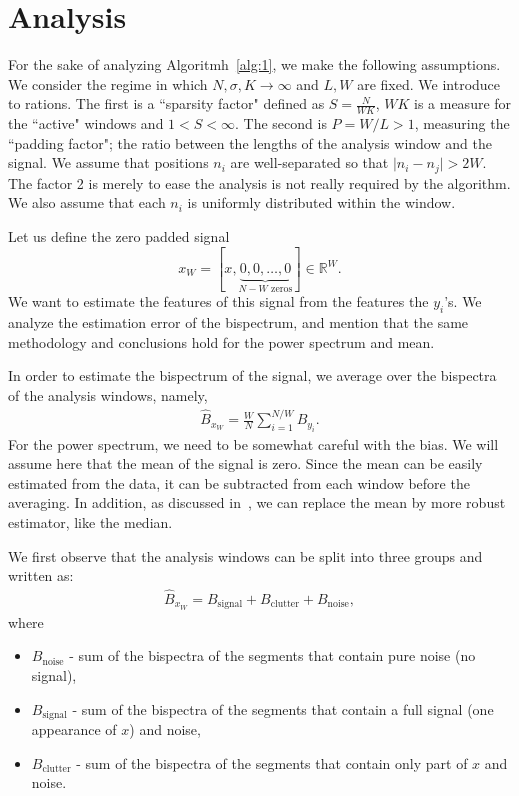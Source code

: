 \documentclass[journal]{IEEEtran}
\numberwithin{equation}{section}
\numberwithin{figure}{section}
\theoremstyle{plain}
\theoremstyle{definition}
\theoremstyle{remark}
\theoremstyle{plain}
\theoremstyle{remark}
\theoremstyle{plain}
\theoremstyle{plain}
\begin{document}
\section{Analysis} \label{sec:analysis}

For the sake of analyzing Algoritmh~\ref{alg:1}, we make the following assumptions. We consider the regime in which $N,\sigma,K\to\infty$ and  $L,W$ are fixed. We introduce to rations. The first is a ``sparsity factor" defined as $S = \frac{N}{WK}$, $WK$ is a measure for the ``active" windows and $1<S<\infty$. The second is $P = W/L>1$, measuring the ``padding factor"; the ratio between the lengths of the analysis window and the signal. We assume that positions $n_i$ are well-separated so that $\vert n_i - n_j\vert >2W$. The factor 2 is merely to ease the analysis is not really required by the algorithm. We also assume that each $n_i$ is uniformly distributed within the window. 


Let us define  the zero padded signal $$x_W  = [x, \underbrace{0,0,\ldots,0}_{N-W \text{ zeros}}]\in\mathbb{R}^W.$$ 
We want to estimate the features of this signal from the features the $y_i$'s. We analyze the estimation error of the bispectrum, and mention that the same methodology and conclusions hold for the power spectrum and mean.


In order to estimate the bispectrum of the signal, we average over the bispectra of the analysis windows, namely,
\begin{eqnarray}
\hat{B}_{x_W} = \frac{W}{N}\sum_{i=1}^{N/W}B_{y_i}.
\end{eqnarray}
For the power spectrum, we need  to be somewhat careful with the bias. We will assume here that the mean of the signal is zero. Since the mean can be easily estimated from the data, it can be subtracted from each window before the averaging. 
 In addition, as discussed in~\cite{bendory2017bispectrum}, we can replace the mean by more robust estimator, like the median.

We first observe that the analysis windows can be split into three groups and written as:
\begin{eqnarray}
\hat{B}_{x_W} = B_\textrm{signal} + B_\textrm{clutter} + B_\textrm{noise}, 
\end{eqnarray}
where
\begin{itemize}
	\item $B_\textrm{noise}$ - sum of the bispectra of the segments that contain pure noise (no signal),
	\item $B_\textrm{signal}$ - sum of the bispectra of the segments that contain a full signal (one appearance of $x$) and noise,
	\item $B_\textrm{clutter}$ - sum of the bispectra of the segments that contain only part of $x$ and noise.
\end{itemize}
\end{document}
